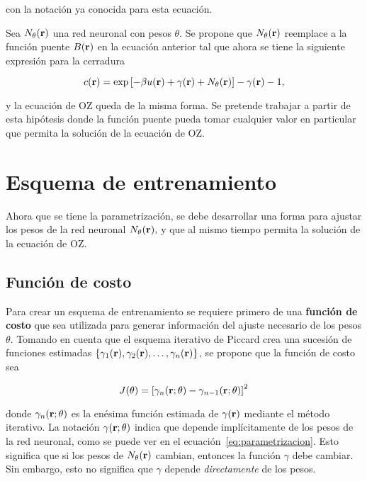 con la notación ya conocida para esta ecuación.

Sea $N_{\theta}(\mathbf{r})$ una red neuronal con pesos $\theta$. Se propone que
$N_{\theta}(\mathbf{r})$ reemplace a la función puente $B(\mathbf{r})$ en la ecuación
anterior tal que ahora se tiene la siguiente expresión para la cerradura

\begin{equation}
    c(\mathbf{r}) = \exp{\left[
            -  \beta u(\mathbf{r})
            +  \gamma(\mathbf{r})
            + N_{\theta}(\mathbf{r})
            \right]} -
    \gamma(\mathbf{r})
    - 1 ,
    \label{eq:parametrizacion}
\end{equation}

y la ecuación de OZ queda de la misma forma.
Se pretende trabajar a partir de esta hipótesis donde la función puente
pueda tomar cualquier valor en particular que permita la solución de la
ecuación de OZ.


\section{Esquema de entrenamiento}
Ahora que se tiene la parametrización, se debe desarrollar una forma para ajustar los
pesos de la red neuronal $N_{\theta}(\mathbf{r}),$ y que al mismo tiempo permita la solución
de la ecuación de OZ.

\subsection{Función de costo}
Para crear un esquema de entrenamiento se requiere primero de una \textbf{función de costo}
que sea utilizada para generar información del ajuste necesario de los pesos $\theta$.
Tomando en cuenta que el esquema iterativo de Piccard crea una sucesión de funciones
estimadas $\{\gamma_1(\mathbf{r}), \gamma_2(\mathbf{r}), \dots, \gamma_n(\mathbf{r})\}$, se propone que la función de costo
sea

\begin{equation}
    J(\theta) = \left[\gamma_{n}(\mathbf{r}; \theta) - \gamma_{n-1}(\mathbf{r}; \theta) \right]^2
    \label{eq:costo}
\end{equation}

donde $\gamma_{n}(\mathbf{r}; \theta)$ es la enésima función estimada de $\gamma(\mathbf{r})$
mediante el método iterativo. La notación $\gamma(\mathbf{r}; \theta)$ indica que depende
implícitamente de los pesos de la red neuronal, como se puede ver en el ecuación~\eqref{eq:parametrizacion}.
Esto significa que si los pesos de $N_{\theta}(\mathbf{r})$ cambian, entonces la función $\gamma$ debe cambiar.
Sin embargo, esto no significa que $\gamma$ depende \emph{directamente} de los pesos.

